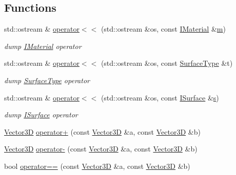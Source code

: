 \subsection*{Functions}
\begin{DoxyCompactItemize}
\item 
std\+::ostream \& \hyperlink{namespace_d_d_surfaces_a35c78a02d17fc318ec3712554a0da234}{operator$<$$<$} (std\+::ostream \&os, const \hyperlink{class_d_d_surfaces_1_1_i_material}{I\+Material} \&\hyperlink{_volumes_8cpp_a6fc379aaec47ce424b00d8ffda2a6c59}{m})
\begin{DoxyCompactList}\small\item\em dump \hyperlink{class_d_d_surfaces_1_1_i_material}{I\+Material} operator \end{DoxyCompactList}\item 
std\+::ostream \& \hyperlink{namespace_d_d_surfaces_abb03d1e9cbbd691e8e30c541e5f9df8a}{operator$<$$<$} (std\+::ostream \&os, const \hyperlink{class_d_d_surfaces_1_1_surface_type}{Surface\+Type} \&t)
\begin{DoxyCompactList}\small\item\em dump \hyperlink{class_d_d_surfaces_1_1_surface_type}{Surface\+Type} operator \end{DoxyCompactList}\item 
std\+::ostream \& \hyperlink{namespace_d_d_surfaces_a13440819dc71cf67cecba8bb55f72726}{operator$<$$<$} (std\+::ostream \&os, const \hyperlink{class_d_d_surfaces_1_1_i_surface}{I\+Surface} \&\hyperlink{_volumes_8cpp_a17ca6bfc8040d695d3cada22a4763d40}{s})
\begin{DoxyCompactList}\small\item\em dump \hyperlink{class_d_d_surfaces_1_1_i_surface}{I\+Surface} operator \end{DoxyCompactList}\item 
\hyperlink{class_d_d_surfaces_1_1_vector3_d}{Vector3D} \hyperlink{namespace_d_d_surfaces_a53190f14a4492924eba5f73fe10b7c2e}{operator+} (const \hyperlink{class_d_d_surfaces_1_1_vector3_d}{Vector3D} \&a, const \hyperlink{class_d_d_surfaces_1_1_vector3_d}{Vector3D} \&b)
\item 
\hyperlink{class_d_d_surfaces_1_1_vector3_d}{Vector3D} \hyperlink{namespace_d_d_surfaces_a99285e6f4b3e9bbe41a5ce357ed5f4ce}{operator-\/} (const \hyperlink{class_d_d_surfaces_1_1_vector3_d}{Vector3D} \&a, const \hyperlink{class_d_d_surfaces_1_1_vector3_d}{Vector3D} \&b)
\item 
bool \hyperlink{namespace_d_d_surfaces_a2fac63bbe49a2ac54035b3b5100241b4}{operator==} (const \hyperlink{class_d_d_surfaces_1_1_vector3_d}{Vector3D} \&a, const \hyperlink{class_d_d_surfaces_1_1_vector3_d}{Vector3D} \&b)

\end{DoxyCompactItemize}
